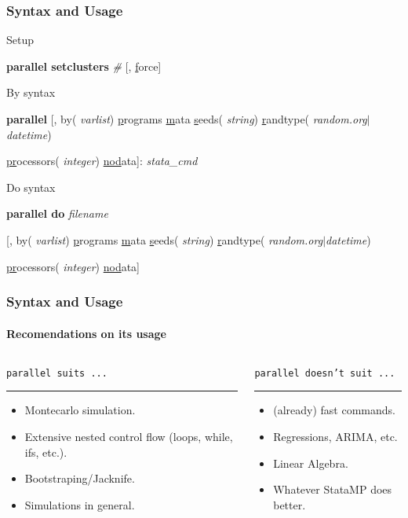 \documentclass[9pt,\ExtraDocOpts]{beamer}
\begin{document}
\begin{frame}
\frametitle{Syntax and Usage}

Setup

\begin{semiverbatim}
\footnotesize
{\bf parallel setclusters} {\it \#}  [, \uline{f}orce] 
\end{semiverbatim}\pause

By syntax

\begin{semiverbatim}
\footnotesize
{\bf parallel} [, by({\it \color{blue} varlist}) \uline{p}rograms \uline{m}ata \uline{s}eeds({\it \color{blue} string}) \uline{r}andtype({\it \color{blue} random.org$|$datetime})

\hspace{1cm} \uline{pr}ocessors({\it \color{blue} integer}) \uline{nod}ata]:  {\it stata\_cmd}
\end{semiverbatim}\pause

Do syntax

\begin{semiverbatim}
\footnotesize
{\bf parallel do} {\it \color{blue} filename}

\hspace{1cm} [, by({\it \color{blue} varlist}) \uline{p}rograms \uline{m}ata \uline{s}eeds({\it \color{blue} string}) \uline{r}andtype({\it \color{blue} random.org$|$datetime})

\hspace{1cm} \uline{pr}ocessors({\it \color{blue} integer}) \uline{nod}ata]
\end{semiverbatim}

\end{frame}


\begin{frame}
\frametitle{Syntax and Usage}
\framesubtitle{Recomendations on its usage}

\begin{columns}
\begin{column}{.5\textwidth}
{\color{gray}
{\tt parallel suits ...}
\rule{\linewidth}{4pt}}
\begin{itemize}
\item Montecarlo simulation.\pause
\item Extensive nested control flow (loops, while, ifs, etc.).\pause
\item Bootstraping/Jacknife.\pause
\item Simulations in general.\pause
\end{itemize}
\end{column}%
\hfill%
\begin{column}{.5\textwidth}
{\color{gray}
{\tt parallel doesn't suit ...}
\rule{\linewidth}{4pt}}
\begin{itemize}
\item (already) fast commands.\pause
\item Regressions, ARIMA, etc.\pause
\item Linear Algebra.\pause
\item Whatever StataMP does better.
\end{itemize}
\end{column}%
\end{columns}
\end{frame}
\end{document}
